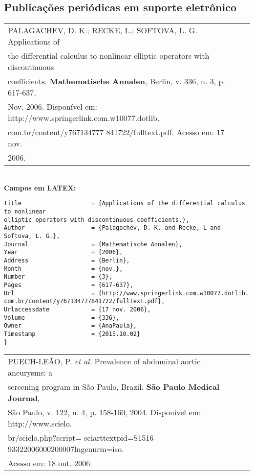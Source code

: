 \subsection{Publicações periódicas em suporte eletrônico}

\begin{tabular}{|l|c|} \hline
	PALAGACHEV, D. K.; RECKE, L.; SOFTOVA, L. G. Applications of\\ the
	differential calculus to nonlinear elliptic operators with discontinuous\\
	coefficients.  \textbf{Mathematische Annalen}, Berlin, v. 336, n. 3, p. 617-637,
	\\Nov. 2006. Disponível em:
	http://www.springerlink.com.w10077.dotlib.\\com.br/content/y767134777
	841722/fulltext.pdf. Acesso em: 17 nov. \\2006. 
	\\\hline
\end{tabular} \\

\textbf{Campos em LATEX:} 

\begin{verbatim}
Title                    = {Applications of the differential calculus 
to nonlinear
elliptic operators with discontinuous coefficients.},
Author                   = {Palagachev, D. K. and Recke, L and 
Softova, L. G.},
Journal                  = {Mathematische Annalen},
Year                     = {2006},
Address                  = {Berlin},
Month                    = {nov.},
Number                   = {3},
Pages                    = {617-637},
Url                      = {http://www.springerlink.com.w10077.dotlib.
com.br/content/y767134777841722/fulltext.pdf},
Urlaccessdate            = {17 nov. 2006},
Volume                   = {336},
Owner                    = {AnaPaula},
Timestamp                = {2015.10.02}
}
\end{verbatim}

\begin{tabular}{|l|c|} \hline
	PUECH-LEÃO, P. \textit{et al.} Prevalence of abdominal aortic aneurysms: a\\
	screening program in São Paulo, Brazil. \textbf{São Paulo Medical Journal},\\
	São Paulo, v. 122, n. 4, p. 158-160, 2004.  Disponível em: http://www.scielo.\\
	br/scielo.php?script= sciarttextpid=S1516-93322006000200007lngennrm=iso. \\
	Acesso em: 18 out. 2006. \\\hline
\end{tabular} \\


